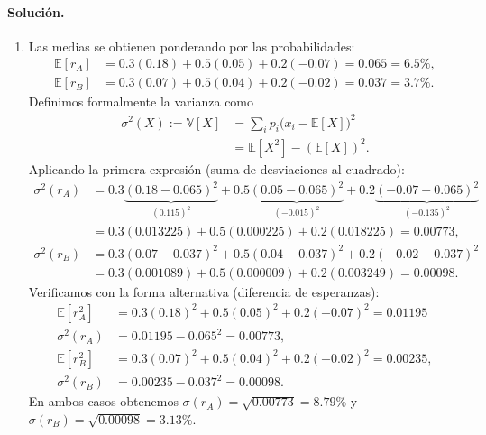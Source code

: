 \documentclass[12pt,a4paper]{article}
\newcommand{\E}{\mathbb{E}}
\newenvironment{solucion}{\paragraph{Solución.}}{}
\begin{document}
\begin{solucion}
\begin{enumerate}[label=\alph*)]
  \item Las medias se obtienen ponderando por las probabilidades:
  \begin{align*}
  \E[r_A] &= 0.3(0.18) + 0.5(0.05) + 0.2(-0.07) = 0.065 = 6.5\%,\\
  \E[r_B] &= 0.3(0.07) + 0.5(0.04) + 0.2(-0.02) = 0.037 = 3.7\%.
  \end{align*}
  Definimos formalmente la varianza como
  \begin{align*}
  \sigma^2(X) := \mathbb{V}[X]
  &= \sum_i p_i\big(x_i-\E[X]\big)^2 \\
  &= \E[X^2] - (\E[X])^2.
  \end{align*}
  Aplicando la primera expresión (suma de desviaciones al cuadrado):
  \begin{align*}
  \sigma^2(r_A) &= 0.3\underbrace{(0.18-0.065)^2}_{(0.115)^2} + 0.5\underbrace{(0.05-0.065)^2}_{(-0.015)^2} + 0.2\underbrace{(-0.07-0.065)^2}_{(-0.135)^2} \\
  &= 0.3(0.013225) + 0.5(0.000225) + 0.2(0.018225) = 0.00773,
  \\[6mm]
  \sigma^2(r_B) &= 0.3(0.07-0.037)^2 + 0.5(0.04-0.037)^2 + 0.2(-0.02-0.037)^2 \\
  &= 0.3(0.001089) + 0.5(0.000009) + 0.2(0.003249) = 0.00098.
  \end{align*}
  Verificamos con la forma alternativa (diferencia de esperanzas):
  \begin{align*}
  \E[r_A^2] &= 0.3(0.18)^2 + 0.5(0.05)^2 + 0.2(-0.07)^2 = 0.01195
  \\ 
  \sigma^2(r_A) &= 0.01195 - 0.065^2 = 0.00773,
  \\[6mm]
  \E[r_B^2] &= 0.3(0.07)^2 + 0.5(0.04)^2 + 0.2(-0.02)^2 = 0.00235, 
  \\
  \sigma^2(r_B) &= 0.00235 - 0.037^2 = 0.00098.
  \end{align*}
  En ambos casos obtenemos $\sigma(r_A) = \sqrt{0.00773} = 8.79\%$ y $\sigma(r_B) = \sqrt{0.00098} = 3.13\%$.


\end{enumerate}
\end{solucion}
\end{document}
